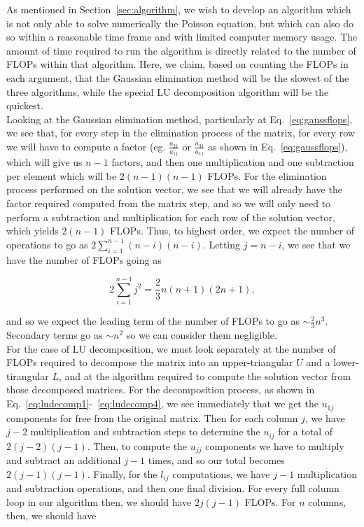 \documentclass[12pt]{article}
\numberwithin{equation}{section}
\begin{document}
As mentioned in Section~\ref{sec:algorithm}, we wish to develop an algorithm which is not only able to solve numerically the Poisson equation, but which can also do so within a reasonable time frame and with limited computer memory usage. The amount of time required to run the algorithm is directly related to the number of FLOPs within that algorithm.  Here, we claim, based on counting the FLOPs in each argument, that the Gaussian elimination method will be the slowest of the three algorithms, while the special LU decomposition algorithm will be the quickest.
\\\indent Looking at the Gaussian elimination method, particularly at Eq.~\ref{eq:gaussflops}, we see that, for every step in the elimination process of the matrix, for every row we will have to compute a factor (eg. $\frac{a_{21}}{a_{11}}$ or $\frac{a_{31}}{a_{11}}$ as shown in Eq.~\ref{eq:gaussflops}), which will give us $n-1$ factors, and then one multiplication and one subtraction per element which will be $2\left(n-1\right)\left(n-1\right)$ FLOPs.  For the elimination process performed on the solution vector, we see that we will already have the factor required computed from the matrix step, and so we will only need to perform a subtraction and multiplication for each row of the solution vector, which yields $2\left(n-1\right)$ FLOPs.  Thus, to highest order, we expect the number of operations to go as $2\sum_{i=1}^{n-1}\left(n-i\right)\left(n-i\right)$.  Letting $j=n-i$, we see that we have the number of FLOPs going as 

$$2\sum_{i=1}^{n-1}j^{2} = \frac{2}{3}n\left(n+1\right)\left(2n+1\right),$$

\noindent and so we expect the leading term of the number of FLOPs to go as $\sim\frac{2}{3}n^{3}$.  Secondary terms go as $\sim n^{2}$ so we can consider them negligible.
\\\indent For the case of LU decomposition, we must look separately at the number of FLOPs required to decompose the matrix into an upper-triangular $U$ and a lower-tirangular $L$, and at the algorithm required to compute the solution vector from those decomposed matrices.  For the decomposition process, as shown in Eq.~\ref{eq:ludecomp1}-~\ref{eq:ludecomp4}, we see immediately that we get the $u_{1j}$ components for free from the original matrix.  Then for each column $j$, we have $j-2$ multiplication and subtraction steps to determine the $u_{ij}$ for a total of $2\left(j-2\right)\left(j-1\right)$.  Then, to compute the $u_{jj}$ components we have to multiply and subtract an additional $j-1$ times, and so our total becomes $2\left(j-1\right)\left(j-1\right)$.  Finally, for the $l_{ij}$ computations, we have $j-1$ multiplication and subtraction operations, and then one final division.  For every full column loop in our algorithm then, we should have $2j\left(j-1\right)$ FLOPs.  For $n$ columns, then, we should have 
\end{document}
